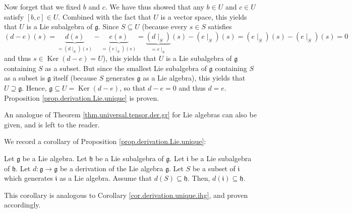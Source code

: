 \documentclass[etingof-lie.tex]{subfiles}
\begin{document}
\begin{verlong}
Now forget that we fixed $b$ and $c$. We have thus showed that any $b\in U$
and $c\in U$ satisfy $\left[  b,c\right]  \in U$. Combined with the fact that
$U$ is a vector space, this yields that $U$ is a Lie subalgebra of
$\mathfrak{g}$. Since $S\subseteq U$ (because every $s\in S$ satisfies%
\[
\left(  d-e\right)  \left(  s\right)  =\underbrace{d\left(  s\right)
}_{=\left(  d\mid_{S}\right)  \left(  s\right)  }-\underbrace{e\left(
s\right)  }_{=\left(  e\mid_{S}\right)  \left(  s\right)  }%
=\underbrace{\left(  d\mid_{S}\right)  }_{=e\mid_{S}}\left(  s\right)
-\left(  e\mid_{S}\right)  \left(  s\right)  =\left(  e\mid_{S}\right)
\left(  s\right)  -\left(  e\mid_{S}\right)  \left(  s\right)  =0
\]
and thus $s\in\operatorname*{Ker}\left(  d-e\right)  =U$), this yields that
$U$ is a Lie subalgebra of $\mathfrak{g}$ containing $S$ as a subset. But
since the smallest Lie subalgebra of $\mathfrak{g}$ containing $S$ as a subset
is $\mathfrak{g}$ itself (because $S$ generates $\mathfrak{g}$ as a Lie
algebra), this yields that $U\supseteq\mathfrak{g}$. Hence, $\mathfrak{g}%
\subseteq U=\operatorname*{Ker}\left(  d-e\right)  $, so that $d-e=0$ and thus
$d=e$. Proposition \ref{prop.derivation.Lie.unique} is proven.
\end{verlong}

\begin{verlong}
An analogue of Theorem \ref{thm.universal.tensor.der.gr} for Lie algebras can
also be given, and is left to the reader.
\end{verlong}

We record a corollary of Proposition \ref{prop.derivation.Lie.unique}:

\begin{corollary}
\label{cor.derivation.Lie.unique.ihg}Let $\mathfrak{g}$ be a Lie algebra. Let
$\mathfrak{h}$ be a Lie subalgebra of $\mathfrak{g}$. Let $\mathfrak{i}$ be a
Lie subalgebra of $\mathfrak{h}$. Let $d:\mathfrak{g}\rightarrow\mathfrak{g}$
be a derivation of the Lie algebra $\mathfrak{g}$. Let $S$ be a subset of
$\mathfrak{i}$ which generates $\mathfrak{i}$ as a Lie algebra. Assume that
$d\left(  S\right)  \subseteq\mathfrak{h}$. Then, $d\left(  \mathfrak{i}%
\right)  \subseteq\mathfrak{h}$.
\end{corollary}

\begin{vershort}
This corollary is analogous to Corollary \ref{cor.derivation.unique.ihg}, and
proven accordingly.
\end{vershort}
\end{document}
